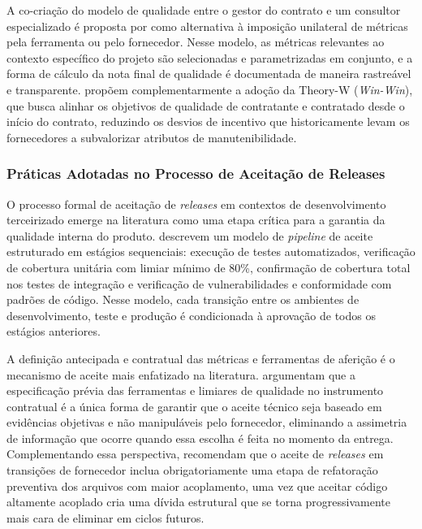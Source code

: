 A co-criação do modelo de qualidade entre o gestor do contrato e um consultor especializado é proposta por  como alternativa à imposição unilateral de métricas pela ferramenta ou pelo fornecedor. Nesse modelo, as métricas relevantes ao contexto específico do projeto são selecionadas e parametrizadas em conjunto, e a forma de cálculo da nota final de qualidade é documentada de maneira rastreável e transparente.  propõem complementarmente a adoção da Theory-W (\textit{Win-Win}), que busca alinhar os objetivos de qualidade de contratante e contratado desde o início do contrato, reduzindo os desvios de incentivo que historicamente levam os fornecedores a subvalorizar atributos de manutenibilidade.

\subsubsection{Práticas Adotadas no Processo de Aceitação de Releases}

O processo formal de aceitação de \textit{releases} em contextos de desenvolvimento terceirizado emerge na literatura como uma etapa crítica para a garantia da qualidade interna do produto.  descrevem um modelo de \textit{pipeline} de aceite estruturado em estágios sequenciais: execução de testes automatizados, verificação de cobertura unitária com limiar mínimo de 80\%, confirmação de cobertura total nos testes de integração e verificação de vulnerabilidades e conformidade com padrões de código. Nesse modelo, cada transição entre os ambientes de desenvolvimento, teste e produção é condicionada à aprovação de todos os estágios anteriores.

A definição antecipada e contratual das métricas e ferramentas de aferição é o mecanismo de aceite mais enfatizado na literatura.  argumentam que a especificação prévia das ferramentas e limiares de qualidade no instrumento contratual é a única forma de garantir que o aceite técnico seja baseado em evidências objetivas e não manipuláveis pelo fornecedor, eliminando a assimetria de informação que ocorre quando essa escolha é feita no momento da entrega. Complementando essa perspectiva,  recomendam que o aceite de \textit{releases} em transições de fornecedor inclua obrigatoriamente uma etapa de refatoração preventiva dos arquivos com maior acoplamento, uma vez que aceitar código altamente acoplado cria uma dívida estrutural que se torna progressivamente mais cara de eliminar em ciclos futuros.

